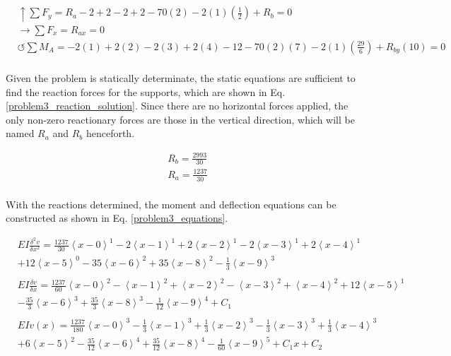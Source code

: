 \documentclass[a4paper]{article}
\begin{document}
\begin{equation}
\begin{split}
	&\uparrow \sum F_y = R_a - 2 + 2 - 2 + 2 - 70(2) - 2(1)\left(\frac{1}{2}\right) + R_b = 0 \\
 	&\rightarrow \sum F_x = R_{ax} = 0 \\
 	&\circlearrowleft \sum M_A = -2(1) + 2(2) - 2(3) + 2(4) - 12 - 70(2)(7) - 2(1)\left(\frac{29}{6}\right) + R_{by}(10) = 0 \\
\end{split}
\label{problem3_reaction_equation}
\end{equation}

Given the problem is statically determinate, the static equations are sufficient to find the reaction forces for the supports, which are shown in Eq. \ref{problem3_reaction_solution}. Since there are no horizontal forces applied, the only non-zero reactionary forces are those in the vertical direction, which will be named $R_a$ and $R_b$ henceforth.

\begin{equation}
\begin{split}
	& R_b = \frac{2993}{30} \\
	& R_a = \frac{1237}{30} \\
\end{split}
\label{problem3_reaction_solution}
\end{equation}

With the reactions determined, the moment and deflection equations can be constructed as shown in Eq. \ref{problem3_equations}.

\begin{equation}
    \begin{split}
& EI \frac{\delta^2 v}{\delta x^2} = \frac{1237}{30}\left<x-0\right>^1 - 2\left<x-1\right>^1 +  2\left<x-2\right>^1 - 2\left<x-3\right>^1 +  2\left<x-4\right>^1 \\
& + 12\left<x-5\right>^0 -  35\left<x-6\right>^2 + 35\left<x-8\right>^2  - \frac{1}{3}\left<x-9\right>^3 \\
& \\
& EI \frac{\delta v}{\delta x} = \frac{1237}{60}\left<x-0\right>^2 - \left<x-1\right>^2 +  \left<x-2\right>^2 - \left<x-3\right>^2 +  \left<x-4\right>^2 + 12\left<x-5\right>^1\\
& -  \frac{35}{3}\left<x-6\right>^3 + \frac{35}{3}\left<x-8\right>^3  - \frac{1}{12}\left<x-9\right>^4 + C_1 \\
& \\
& EI v(x) =\frac{1237}{180}\left<x-0\right>^3 - \frac{1}{3}\left<x-1\right>^3 +  \frac{1}{3}\left<x-2\right>^3 - \frac{1}{3}\left<x-3\right>^3 +  \frac{1}{3}\left<x-4\right>^3\\
& + 6\left<x-5\right>^2 -  \frac{35}{12}\left<x-6\right>^4 + \frac{35}{12}\left<x-8\right>^4  - \frac{1}{60}\left<x-9\right>^5 + C_1x + C_2 \\ \\
    \end{split}
\label{problem3_equations}
\end{equation}
\end{document}
